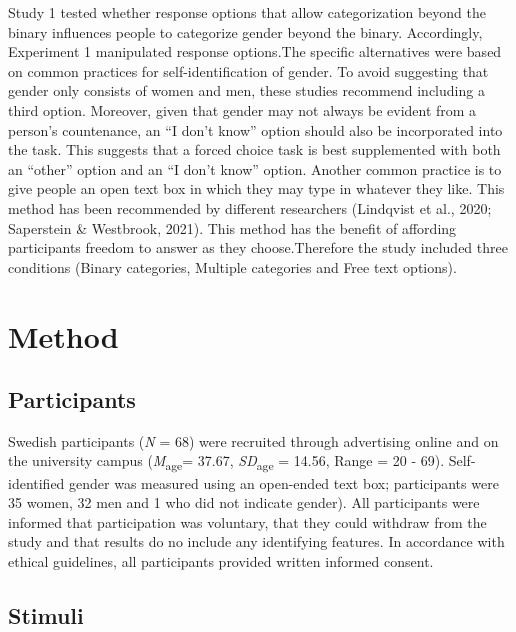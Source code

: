 \documentclass[
  man]{apa7}
\begin{document}
Study 1 tested whether response options that allow categorization beyond the binary influences people to categorize gender beyond the binary. Accordingly, Experiment 1 manipulated response options.The specific alternatives were based on common practices for self-identification of gender. To avoid suggesting that gender only consists of women and men, these studies recommend including a third option. Moreover, given that gender may not always be evident from a person's countenance, an ``I don't know'' option should also be incorporated into the task. This suggests that a forced choice task is best supplemented with both an ``other'' option and an ``I don't know'' option. Another common practice is to give people an open text box in which they may type in whatever they like. This method has been recommended by different researchers (Lindqvist et al., 2020; Saperstein \& Westbrook, 2021). This method has the benefit of affording participants freedom to answer as they choose.Therefore the study included three conditions (Binary categories, Multiple categories and Free text options).

\hypertarget{method}{%
\section{Method}\label{method}}

\hypertarget{participants}{%
\subsection{Participants}\label{participants}}

Swedish participants (\emph{N} = 68) were recruited through advertising online and on the university campus (\emph{M}\textsubscript{age}= 37.67, \emph{SD}\textsubscript{age} = 14.56, Range = 20 - 69). Self-identified gender was measured using an open-ended text box; participants were 35 women, 32 men and 1 who did not indicate gender). All participants were informed that participation was voluntary, that they could withdraw from the study and that results do no include any identifying features. In accordance with ethical guidelines, all participants provided written informed consent.

\hypertarget{stimuli}{%
\subsection{Stimuli}\label{stimuli}}
\end{document}
